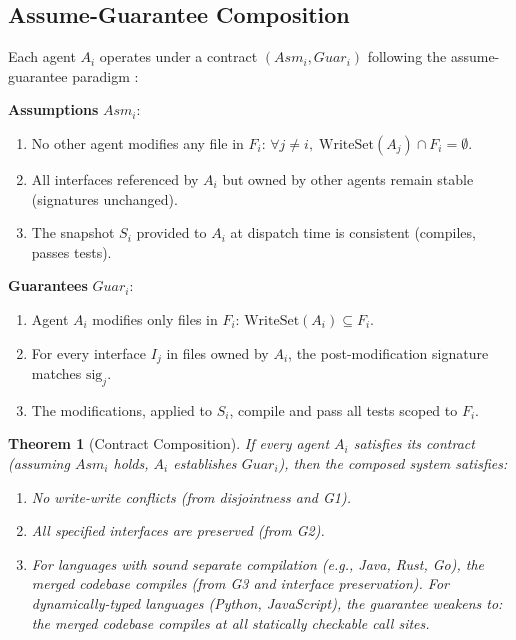 \documentclass[11pt, a4paper, logo, copyright]{googledeepmind}
\newtheorem{theorem}{Theorem}[section]
\begin{document}
\subsection{Assume-Guarantee Composition}

Each agent $A_i$ operates under a contract $(Asm_i, Guar_i)$ following the assume-guarantee paradigm \citep{meyer1992, henzinger2002}:

\medskip
\noindent\textbf{Assumptions} $Asm_i$:
\begin{enumerate}[nosep, label=(A\arabic*)]
    \item No other agent modifies any file in $F_i$: $\forall j \neq i, \; \mathrm{WriteSet}(A_j) \cap F_i = \emptyset$.
    \item All interfaces referenced by $A_i$ but owned by other agents remain stable (signatures unchanged).
    \item The snapshot $S_i$ provided to $A_i$ at dispatch time is consistent (compiles, passes tests).
\end{enumerate}

\noindent\textbf{Guarantees} $Guar_i$:
\begin{enumerate}[nosep, label=(G\arabic*)]
    \item Agent $A_i$ modifies only files in $F_i$: $\mathrm{WriteSet}(A_i) \subseteq F_i$.
    \item For every interface $I_j$ in files owned by $A_i$, the post-modification signature matches $\mathrm{sig}_j$.
    \item The modifications, applied to $S_i$, compile and pass all tests scoped to $F_i$.
\end{enumerate}

\begin{theorem}[Contract Composition]
\label{thm:composition}
If every agent $A_i$ satisfies its contract (assuming $Asm_i$ holds, $A_i$ establishes $Guar_i$), then the composed system satisfies:
\begin{enumerate}[nosep]
    \item No write-write conflicts (from disjointness and G1).
    \item All specified interfaces are preserved (from G2).
    \item For languages with sound separate compilation (e.g., Java, Rust, Go), the merged codebase compiles (from G3 and interface preservation). For dynamically-typed languages (Python, JavaScript), the guarantee weakens to: the merged codebase compiles at all statically checkable call sites.
\end{enumerate}
\end{theorem}
\end{document}
